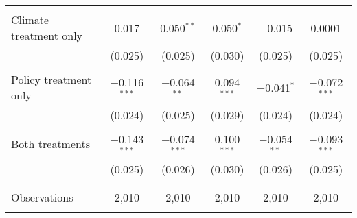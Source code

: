 \begin{tabular}{@{\extracolsep{5pt}}lccccc}
  & & & & & \\ 
 Climate treatment only & 0.017 & 0.050$^{**}$ & 0.050$^{*}$ & $-$0.015 & 0.0001 \\ 
  & (0.025) & (0.025) & (0.030) & (0.025) & (0.025) \\ 
  & & & & & \\ 
 Policy treatment only & $-$0.116$^{***}$ & $-$0.064$^{**}$ & 0.094$^{***}$ & $-$0.041$^{*}$ & $-$0.072$^{***}$ \\ 
  & (0.024) & (0.025) & (0.029) & (0.024) & (0.024) \\ 
  & & & & & \\ 
 Both treatments & $-$0.143$^{***}$ & $-$0.074$^{***}$ & 0.100$^{***}$ & $-$0.054$^{**}$ & $-$0.093$^{***}$ \\ 
  & (0.025) & (0.026) & (0.030) & (0.026) & (0.025) \\ 
  & & & & & \\ 
\hline \\[-1.8ex] 

Observations & 2,010 & 2,010 & 2,010 & 2,010 & 2,010 \\ 
\hline 
\hline \\[-1.8ex] 
\end{tabular} 